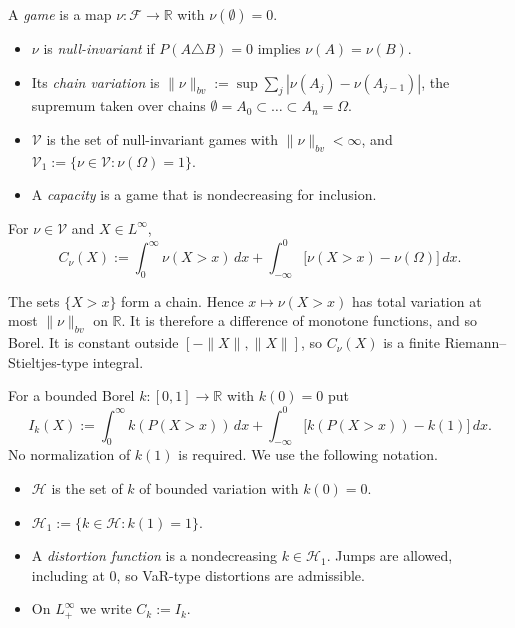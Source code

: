 \begin{definition}
A \emph{game} is a map $\nu:\mathcal F\to\mathbb R$ with $\nu(\emptyset)=0$.
\begin{itemize}
\item $\nu$ is \emph{null-invariant} if $P(A\triangle B)=0$ implies $\nu(A)=\nu(B)$.
\item Its \emph{chain variation} is $\|\nu\|_{bv}:=\sup\sum_j|\nu(A_j)-\nu(A_{j-1})|$, the supremum taken over chains $\emptyset=A_0\subset\dots\subset A_n=\Omega$.
\item $\mathcal V$ is the set of null-invariant games with $\|\nu\|_{bv}<\infty$, and $\mathcal V_1:=\{\nu\in\mathcal V:\nu(\Omega)=1\}$.
\item A \emph{capacity} is a game that is nondecreasing for inclusion.
\end{itemize}
For $\nu\in\mathcal V$ and $X\in L^\infty$,
\[
C_\nu(X):=\int_0^\infty\nu(X>x)\,dx+\int_{-\infty}^0\big[\nu(X>x)-\nu(\Omega)\big]\,dx .
\]
\end{definition}

\begin{remark}[Measurability]
The sets $\{X>x\}$ form a chain. Hence $x\mapsto\nu(X>x)$ has total variation at most $\|\nu\|_{bv}$ on $\mathbb R$. It is therefore a difference of monotone functions, and so Borel. It is constant outside $[-\|X\|,\|X\|]$, so $C_\nu(X)$ is a finite Riemann--Stieltjes-type integral.
\end{remark}

\begin{definition}[Distortions]
For a bounded Borel $k:[0,1]\to\mathbb R$ with $k(0)=0$ put
\[
I_k(X):=\int_0^\infty k(P(X>x))\,dx+\int_{-\infty}^0\big[k(P(X>x))-k(1)\big]\,dx .
\]
No normalization of $k(1)$ is required. We use the following notation.
\begin{itemize}
\item $\mathcal H$ is the set of $k$ of bounded variation with $k(0)=0$.
\item $\mathcal H_1:=\{k\in\mathcal H:k(1)=1\}$.
\item A \emph{distortion function} is a nondecreasing $k\in\mathcal H_1$. Jumps are allowed, including at $0$, so VaR-type distortions are admissible.
\item On $L^\infty_+$ we write $C_k:=I_k$.
\end{itemize}
\end{definition}

